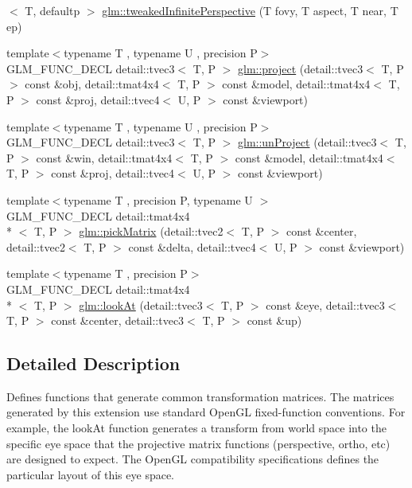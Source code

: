 \begin{DoxyCompactItemize}
$<$ T, defaultp $>$ \hyperlink{group__gtc__matrix__transform_gade8abc58c0ac541163e872eb66f3e5de}{glm\-::tweaked\-Infinite\-Perspective} (T fovy, T aspect, T near, T ep)
\item 
{\footnotesize template$<$typename T , typename U , precision P$>$ }\\G\-L\-M\-\_\-\-F\-U\-N\-C\-\_\-\-D\-E\-C\-L detail\-::tvec3$<$ T, P $>$ \hyperlink{group__gtc__matrix__transform_ga41227b7b98882dcbaa8dab52df372c7b}{glm\-::project} (detail\-::tvec3$<$ T, P $>$ const \&obj, detail\-::tmat4x4$<$ T, P $>$ const \&model, detail\-::tmat4x4$<$ T, P $>$ const \&proj, detail\-::tvec4$<$ U, P $>$ const \&viewport)
\item 
{\footnotesize template$<$typename T , typename U , precision P$>$ }\\G\-L\-M\-\_\-\-F\-U\-N\-C\-\_\-\-D\-E\-C\-L detail\-::tvec3$<$ T, P $>$ \hyperlink{group__gtc__matrix__transform_ga4b0a9086d15e2a743ecd7b6128146af1}{glm\-::un\-Project} (detail\-::tvec3$<$ T, P $>$ const \&win, detail\-::tmat4x4$<$ T, P $>$ const \&model, detail\-::tmat4x4$<$ T, P $>$ const \&proj, detail\-::tvec4$<$ U, P $>$ const \&viewport)
\item 
{\footnotesize template$<$typename T , precision P, typename U $>$ }\\G\-L\-M\-\_\-\-F\-U\-N\-C\-\_\-\-D\-E\-C\-L detail\-::tmat4x4\\*
$<$ T, P $>$ \hyperlink{group__gtc__matrix__transform_ga0fb64f04bf5ad52523fcd4b10b46aff6}{glm\-::pick\-Matrix} (detail\-::tvec2$<$ T, P $>$ const \&center, detail\-::tvec2$<$ T, P $>$ const \&delta, detail\-::tvec4$<$ U, P $>$ const \&viewport)
\item 
{\footnotesize template$<$typename T , precision P$>$ }\\G\-L\-M\-\_\-\-F\-U\-N\-C\-\_\-\-D\-E\-C\-L detail\-::tmat4x4\\*
$<$ T, P $>$ \hyperlink{group__gtc__matrix__transform_ga454fdf3163c2779eeeeeb9d75907ce97}{glm\-::look\-At} (detail\-::tvec3$<$ T, P $>$ const \&eye, detail\-::tvec3$<$ T, P $>$ const \&center, detail\-::tvec3$<$ T, P $>$ const \&up)
\end{DoxyCompactItemize}


\subsection{Detailed Description}
Defines functions that generate common transformation matrices. The matrices generated by this extension use standard Open\-G\-L fixed-\/function conventions. For example, the look\-At function generates a transform from world space into the specific eye space that the projective matrix functions (perspective, ortho, etc) are designed to expect. The Open\-G\-L compatibility specifications defines the particular layout of this eye space.


